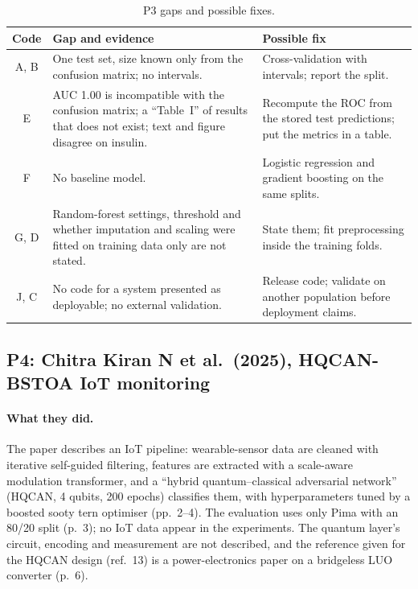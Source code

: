 \documentclass[11pt,a4paper]{article}
\begin{document}
\begin{table}[H]
\centering\footnotesize
\caption{P3 gaps and possible fixes.}
\begin{tabularx}{\textwidth}{c Y Y}
\toprule
Code & Gap and evidence & Possible fix \\
\midrule
A, B & One test set, size known only from the confusion matrix; no intervals. & Cross-validation with intervals; report the split. \\
E & AUC 1.00 is incompatible with the confusion matrix; a ``Table~I'' of results that does not exist; text and figure disagree on insulin. & Recompute the ROC from the stored test predictions; put the metrics in a table. \\
F & No baseline model. & Logistic regression and gradient boosting on the same splits. \\
G, D & Random-forest settings, threshold and whether imputation and scaling were fitted on training data only are not stated. & State them; fit preprocessing inside the training folds. \\
J, C & No code for a system presented as deployable; no external validation. & Release code; validate on another population before deployment claims. \\
\bottomrule
\end{tabularx}
\end{table}

\subsection{P4: Chitra Kiran N et al.\ (2025), HQCAN-BSTOA IoT monitoring}
\label{sec:p4}
\paragraph{What they did.} The paper describes an IoT pipeline: wearable-sensor data are cleaned with iterative self-guided filtering, features are extracted with a scale-aware modulation transformer, and a ``hybrid quantum--classical adversarial network'' (HQCAN, 4 qubits, 200 epochs) classifies them, with hyperparameters tuned by a boosted sooty tern optimiser (pp.~2--4). The evaluation uses only Pima with an 80/20 split (p.~3); no IoT data appear in the experiments. The quantum layer's circuit, encoding and measurement are not described, and the reference given for the HQCAN design (ref.~13) is a power-electronics paper on a bridgeless LUO converter (p.~6).
\end{document}
